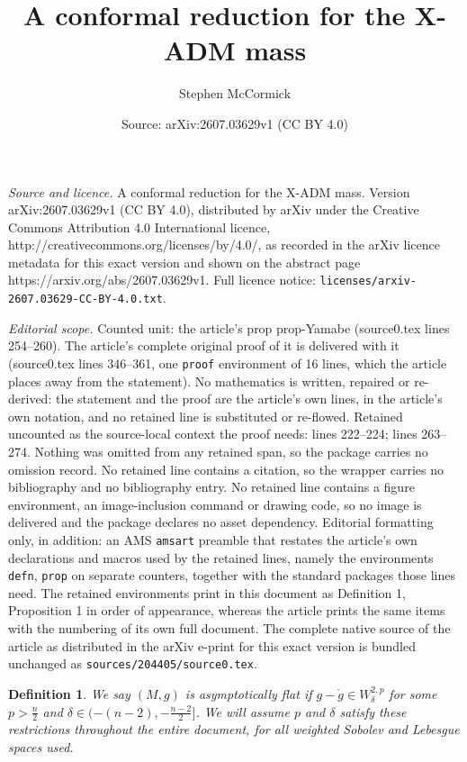 \documentclass[10pt,a4paper]{amsart}
\title{A conformal reduction for the X-ADM mass}
\author{Stephen McCormick}
\date{Source: arXiv:2607.03629v1 (CC BY 4.0)}
\newtheorem{defn}{Definition}
\begin{document}
\maketitle

\noindent\emph{Source and licence.} A conformal reduction for the X-ADM mass. Version arXiv:2607.03629v1 (CC BY 4.0), distributed by arXiv under the Creative Commons Attribution 4.0 International licence, http://creativecommons.org/licenses/by/4.0/, as recorded in the arXiv licence metadata for this exact version and shown on the abstract page https://arxiv.org/abs/2607.03629v1. Full licence notice: \texttt{licenses/arxiv-2607.03629-CC-BY-4.0.txt}.\par\smallskip

\noindent\textit{Editorial scope.} Counted unit: the article's prop prop-Yamabe (source0.tex lines 254--260). The article's complete original proof of it is delivered with it (source0.tex lines 346--361, one \texttt{proof} environment of 16 lines, which the article places away from the statement). No mathematics is written, repaired or re-derived: the statement and the proof are the article's own lines, in the article's own notation, and no retained line is substituted or re-flowed.  Retained uncounted as the source-local context the proof needs: lines 222--224; lines 263--274.  Nothing was omitted from any retained span, so the package carries no omission record.  No retained line contains a citation, so the wrapper carries no bibliography and no bibliography entry.  No retained line contains a figure environment, an image-inclusion command or drawing code, so no image is delivered and the package declares no asset dependency.  Editorial formatting only, in addition: an AMS \texttt{amsart} preamble that restates the article's own declarations and macros used by the retained lines, namely the environments \texttt{defn}, \texttt{prop} on separate counters, together with the standard packages those lines need.  The retained environments print in this document as Definition 1, Proposition 1 in order of appearance, whereas the article prints the same items with the numbering of its own full document.  The complete native source of the article as distributed in the arXiv e-print for this exact version is bundled unchanged as \texttt{sources/204405/source0.tex}.
\begin{defn}\label{def-AF}
	We say $(M,g)$ is \textit{asymptotically flat} if $g-\mathring{g}\in W^{2,p}_\delta$ for some $p>\frac{n}{2}$ and $\delta\in(-(n-2),-\frac{n-2}{2}]$. \textit{We will assume $p$ and $\delta$ satisfy these restrictions throughout the entire document, for all weighted Sobolev and Lebesgue spaces used.}
\end{defn}
\end{document}
